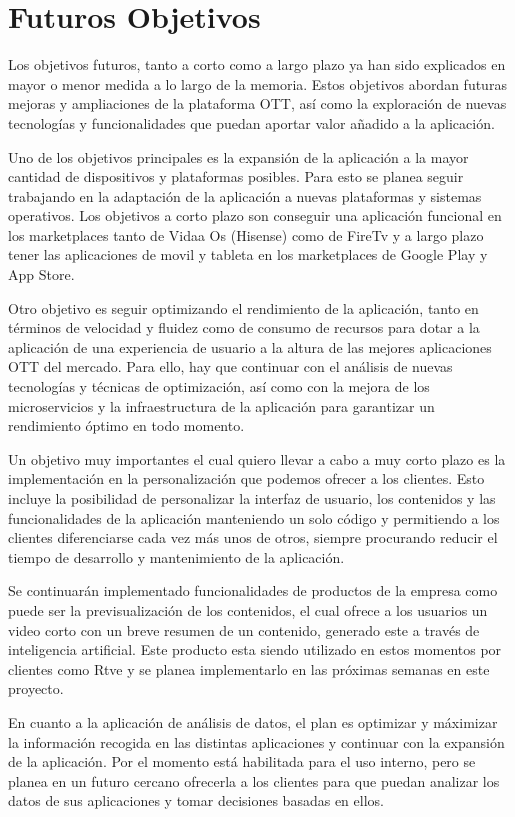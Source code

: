 \chapter{Futuros Objetivos}
\label{chap:futuros_objetivos}

Los objetivos futuros, tanto a corto como a largo plazo ya han sido explicados en mayor o menor medida a lo largo de la memoria.
Estos objetivos abordan futuras mejoras y ampliaciones de la plataforma OTT, así como la exploración de nuevas tecnologías y
funcionalidades que puedan aportar valor añadido a la aplicación. 

Uno de los objetivos principales es la expansión de la aplicación a la mayor cantidad de dispositivos y plataformas posibles.
Para esto se planea seguir trabajando en la adaptación de la aplicación a nuevas plataformas y sistemas operativos. Los objetivos a 
corto plazo son conseguir una aplicación funcional en los marketplaces tanto de Vidaa Os  (Hisense) como de FireTv y a largo plazo tener las 
aplicaciones de movil y tableta en los marketplaces de Google Play y App Store.

Otro objetivo es seguir optimizando el rendimiento de la aplicación, tanto en términos de velocidad y fluidez como de consumo de recursos para 
dotar a la aplicación de una experiencia de usuario a la altura de las mejores aplicaciones OTT del mercado. Para ello, hay que continuar con 
el análisis de nuevas tecnologías y técnicas de optimización, así como con la mejora de los microservicios y la infraestructura de la aplicación
para garantizar un rendimiento óptimo en todo momento.

Un objetivo muy importantes el cual quiero llevar a cabo a muy corto plazo es la implementación en la personalización que podemos ofrecer a los 
clientes. Esto incluye la posibilidad de personalizar la interfaz de usuario, los contenidos y las funcionalidades de la aplicación manteniendo 
un solo código y permitiendo a los clientes diferenciarse cada vez más unos de otros, siempre procurando reducir el tiempo de desarrollo y
mantenimiento de la aplicación.

Se continuarán implementado funcionalidades de productos de la empresa como puede ser  la previsualización de los contenidos, el cual ofrece a los 
usuarios un video corto con un breve resumen de un contenido, generado este a través de inteligencia artificial. Este producto esta siendo
utilizado en estos momentos por clientes como Rtve y se planea implementarlo en las próximas semanas en este proyecto.

En cuanto a la aplicación de análisis de datos, el plan es optimizar y máximizar la información recogida en las distintas aplicaciones y 
continuar con la expansión de la aplicación. Por el momento está habilitada para el uso interno, pero se planea en un futuro cercano
ofrecerla a los clientes para que puedan analizar los datos de sus aplicaciones y tomar decisiones basadas en ellos.

